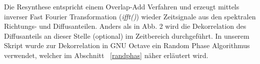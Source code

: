 Die Resynthese entspricht einem Overlap-Add Verfahren und erzeugt mittels inverser Fast Fourier Transformation (\textit{ifft()}) wieder Zeitsignale aus den spektralen Richtungs- und Diffusanteilen. Anders als in Abb. 2 wird die Dekorrelation des Diffusanteils an dieser Stelle (optional) im Zeitbereich durchgeführt. In unserem Skript wurde zur Dekorrelation in GNU Octave ein Random Phase Algorithmus verwendet, welcher im Abschnitt ~\ref{randphas} näher erläutert wird.